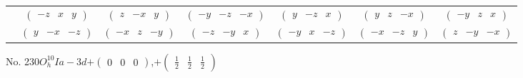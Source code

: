 \documentclass[fleqn,9pt,landscape]{jsarticle}
\begin{document}
\begin{center}
\begin{longtable}{ccccccc}
& $ \begin{pmatrix} - z & x & y \end{pmatrix} $ & $ \begin{pmatrix} z & - x & y \end{pmatrix} $ & $ \begin{pmatrix} - y & - z & - x \end{pmatrix} $ & $ \begin{pmatrix} y & - z & x \end{pmatrix} $ & $ \begin{pmatrix} y & z & - x \end{pmatrix} $ & $ \begin{pmatrix} - y & z & x \end{pmatrix} $ \\
& $ \begin{pmatrix} y & - x & - z \end{pmatrix} $ & $ \begin{pmatrix} - x & z & - y \end{pmatrix} $ & $ \begin{pmatrix} - z & - y & x \end{pmatrix} $ & $ \begin{pmatrix} - y & x & - z \end{pmatrix} $ & $ \begin{pmatrix} - x & - z & y \end{pmatrix} $ & $ \begin{pmatrix} z & - y & - x \end{pmatrix} $ \\
\end{longtable}
\end{center}
\newpage
No. 230\quad$O_{h}^{10}$\quad$Ia-3d$\quad[ cubic ]\quad$+\begin{pmatrix} 0 & 0 & 0 \end{pmatrix}$,\quad $+\begin{pmatrix} \frac{1}{2} & \frac{1}{2} & \frac{1}{2} \end{pmatrix}$
\end{document}
